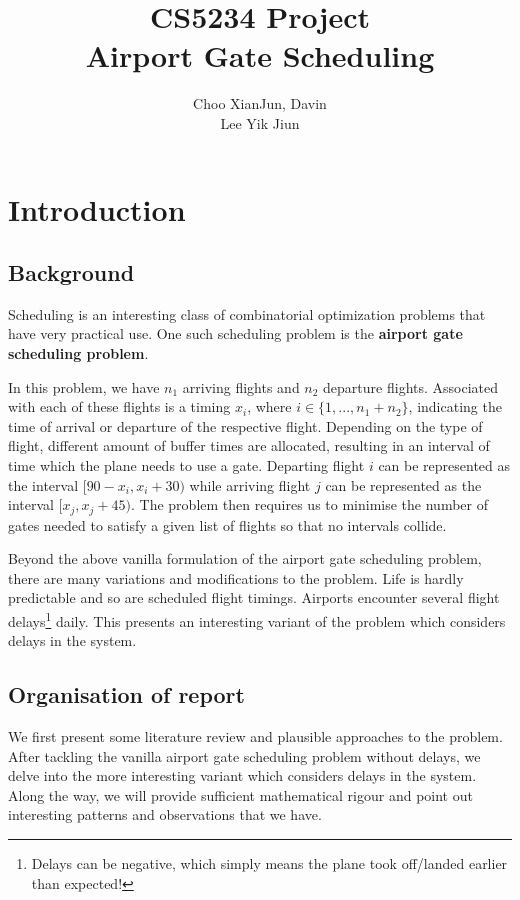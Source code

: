 \documentclass[12pt, a4paper]{report}
\begin{document}
\title{CS5234 Project\\ Airport Gate Scheduling}
\author{Choo XianJun, Davin \\ Lee Yik Jiun}
\date{}
\maketitle


\setcounter{tocdepth}{1}
\tableofcontents 

\chapter{Introduction}
\section{Background}
Scheduling is an interesting class of combinatorial optimization problems that have very practical use. One such scheduling problem is the \textbf{airport gate scheduling problem}.

In this problem, we have $n_1$ arriving flights and $n_2$ departure flights. Associated with each of these flights is a timing $x_i$, where $i \in \{1, ... , n_1 + n_2\}$, indicating the time of arrival or departure of the respective flight. Depending on the type of flight, different amount of buffer times are allocated, resulting in an interval of time which the plane needs to use a gate. Departing flight $i$ can be represented as the interval $[90 - x_i, x_i + 30)$ while arriving flight $j$ can be represented as the interval $[x_j, x_j + 45)$. The problem then requires us to minimise the number of gates needed to satisfy a given list of flights so that no intervals collide.

Beyond the above vanilla formulation of the airport gate scheduling problem, there are many variations and modifications to the problem. Life is hardly predictable and so are scheduled flight timings. Airports encounter several flight delays\footnote{Delays can be negative, which simply means the plane took off/landed earlier than expected!} daily. This presents an interesting variant of the problem which considers delays in the system.

\section{Organisation of report}
We first present some literature review and plausible approaches to the problem. After tackling the vanilla airport gate scheduling problem without delays, we delve into the more interesting variant which considers delays in the system. Along the way, we will provide sufficient mathematical rigour and point out interesting patterns and observations that we have.
\end{document}

